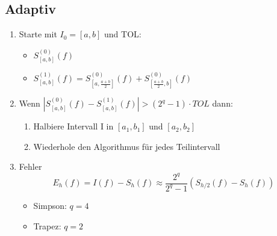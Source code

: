 \subsection{Adaptiv}
\begin{enumerate}
	
	\item Starte mit $I_0 = [a, b]$ und TOL: \\
	\begin{itemize}
		\item $S_{[a,b]}^{(0)}(f)$
		\item $S_{[a,b]}^{(1)}(f) = S_{[a,\frac{a+b}{2}]}^{(0)}(f) + S_{[\frac{a+b}{2},b]}^{(0)}(f)$
	\end{itemize}
	
	\item Wenn $|S_{[a,b]}^{(0)}(f) - S_{[a,b]}^{(1)}(f)| > (2^q-1)\cdot TOL$ dann: \\
	
	\begin{enumerate}
		
		\item Halbiere Intervall I in $[a_1, b_1]$ und $[a_2, b_2]$	
		
		\item Wiederhole den Algorithmus für jedes Teilintervall
		
	\end{enumerate}
	
	\item Fehler
	\begin{equation*}
		E_h(f)= I(f) - S_h(f) \approx \frac{2^q}{2^q-1}(S_{h/2}(f)-S_h(f))
	\end{equation*}
	\begin{itemize}
		\item Simpson: $q = 4$
		\item Trapez: $q = 2$
	\end{itemize}
	
\end{enumerate}